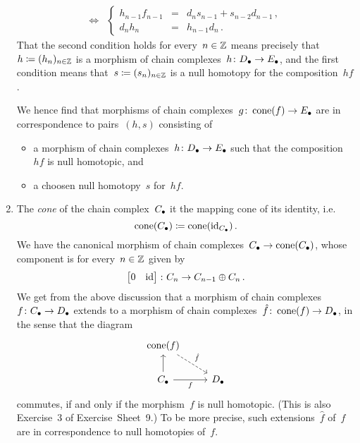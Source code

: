 \begin{remark*}
\begin{enumerate}
\begin{align*}
        \iff&{}   \left\{
                    \begin{array}{rcl}
                      h_{n-1} f_{n-1} &=& d_n s_{n-1} + s_{n-2} d_{n-1} \,, \\
                      d_n h_n     &=& h_{n-1} d_n \,.
                    \end{array}
                  \right.
      \end{align*}
      That the second condition holds for every~$n \in \mathbb{Z}$ means precisely that~$h \coloneqq (h_n)_{n \in \mathbb{Z}}$ is a morphism of chain complexes~$h \colon D_\bullet \to E_\bullet$, and the first condition means that~$s \coloneqq (s_n)_{n \in \mathbb{Z}}$ is a null homotopy for the composition~$h f$.
      
      We hence find that morphisms of chain complexes~$g \colon \operatorname{cone}(f) \to E_\bullet$ are in {\onetoone} correspondence to pairs~$(h,s)$ consisting of
      \begin{itemize}
        \item
          a morphism of chain complexes~$h \colon D_\bullet \to E_\bullet$ such that the composition~$hf$ is null homotopic, and
        \item
          a choosen null homotopy~$s$ for~$hf$.
      \end{itemize}
    \item
      The \emph{cone} of the chain complex~$C_\bullet$ it the mapping cone of its identity, i.e.\
      \[
                  \operatorname{cone}(C_\bullet)
        \coloneqq  \operatorname{cone}(\operatorname{id}_{C_\bullet}) \,.
      \]
      We have the canonical morphism of chain complexes~$C_\bullet \to \operatorname{cone}(C_\bullet)$, whose~ component is for every~$n \in \mathbb{Z}$ given by
      \[
        \begin{bmatrix}
            0
          & \operatorname{id}
        \end{bmatrix}
        \colon
        C_n
        \to
        C_{n-1} \oplus C_n \,.
      \]
      We get from the above discussion that a morphism of chain complexes~$f \colon C_\bullet \to D_\bullet$ extends to a morphism of chain complexes~$\hat{f} \colon \operatorname{cone}(f) \to D_\bullet$, in the sense that the diagram
      \[
        \begin{tikzcd}
            \cone(f)
            \arrow[dashed]{dr}[above right]{\hat{f}}
          & {}
          \\
            \Ccc
            \arrow{u}
            \arrow{r}[below]{f}
          & \Dcc
        \end{tikzcd}
      \]
      commutes, if and only if the morphism~$f$ is null homotopic.
      (This is also Exercise~3 of Exercise~Sheet~9.)
      To be more precise, such extensions~$\hat{f}$ of~$f$ are in {\onetoone} correspondence to null homotopies of~$f$.
  \end{enumerate}
\end{remark*}










